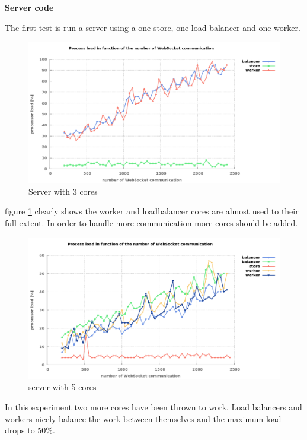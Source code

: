 \textbf{Server code}

The first test is run a server using a one store, one load balancer and one
worker.

\begin{figure}[H]
	\centering
		\includegraphics[width=\textwidth]{./Figures/WS_server_1rising.png}
	\caption[WebSocket server on three cores]{Server with 3 cores}
	\label{fig:WS_server_1rising}
\end{figure}

figure \ref{fig:WS_server_1rising} clearly shows the worker and loadbalancer
cores are almost used to their full extent. In order to handle more communication more
cores should be added. 

\begin{figure}[H]
	\centering
		\includegraphics[width=\textwidth]{./Figures/WS_server_2rising.png}
	\caption[WebSocket server on five cores]{server with 5 cores}
	\label{fig:WS_server_2rising}
\end{figure}

In this experiment two more cores have been thrown to work. Load balancers and
workers nicely balance the work between themselves and the maximum load drops to 50\%.

